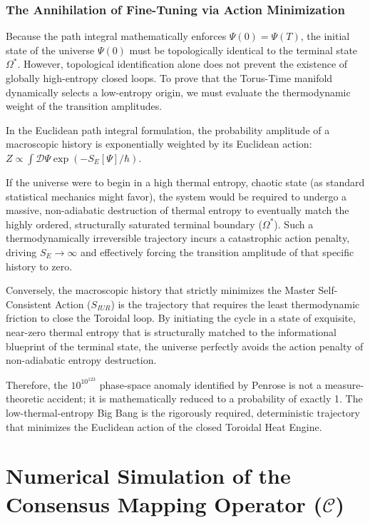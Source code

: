 \documentclass[12pt,openany]{book}
\theoremstyle{plain}
\theoremstyle{definition}
\theoremstyle{remark}
\begin{document}
\subsection{The Annihilation of Fine-Tuning via Action Minimization}

Because the path integral mathematically enforces $\Psi(0) = \Psi(T)$, the initial state of the universe $\Psi(0)$ must be topologically identical to the terminal state $\Omega^*$. However, topological identification alone does not prevent the existence of globally high-entropy closed loops. To prove that the Torus-Time manifold dynamically selects a low-entropy origin, we must evaluate the thermodynamic weight of the transition amplitudes.

In the Euclidean path integral formulation, the probability amplitude of a macroscopic history is exponentially weighted by its Euclidean action: $Z \propto \int \mathcal{D}\Psi \exp(-S_E[\Psi]/\hbar)$. 

If the universe were to begin in a high thermal entropy, chaotic state (as standard statistical mechanics might favor), the system would be required to undergo a massive, non-adiabatic destruction of thermal entropy to eventually match the highly ordered, structurally saturated terminal boundary ($\Omega^*$). Such a thermodynamically irreversible trajectory incurs a catastrophic action penalty, driving $S_E \to \infty$ and effectively forcing the transition amplitude of that specific history to zero.

Conversely, the macroscopic history that strictly minimizes the Master Self-Consistent Action ($S_{IUR}$) is the trajectory that requires the least thermodynamic friction to close the Toroidal loop. By initiating the cycle in a state of exquisite, near-zero thermal entropy that is structurally matched to the informational blueprint of the terminal state, the universe perfectly avoids the action penalty of non-adiabatic entropy destruction. 

Therefore, the $10^{10^{123}}$ phase-space anomaly identified by Penrose is not a measure-theoretic accident; it is mathematically reduced to a probability of exactly 1. The low-thermal-entropy Big Bang is the rigorously required, deterministic trajectory that minimizes the Euclidean action of the closed Toroidal Heat Engine.

\chapter[The Consensus Mapping Operator]{Numerical Simulation of the Consensus Mapping Operator ($\mathcal{C}$)}
\end{document}
